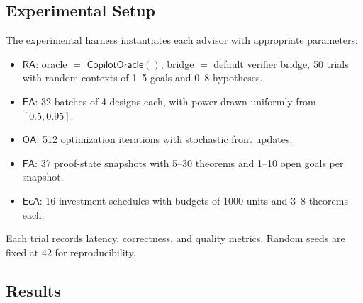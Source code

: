 \documentclass[11pt]{article}
\newcommand{\RA}{\mathsf{RA}}
\newcommand{\EA}{\mathsf{EA}}
\newcommand{\OA}{\mathsf{OA}}
\newcommand{\FA}{\mathsf{FA}}
\newcommand{\EcA}{\mathsf{EcA}}
\begin{document}
\subsection{Experimental Setup}\label{sec:exp-setup}

The experimental harness instantiates each advisor with
appropriate parameters:
\begin{itemize}
  \item $\RA$: oracle $=$ $\mathsf{CopilotOracle}()$, bridge
        $=$ default verifier bridge, 50 trials with random
        contexts of 1--5 goals and 0--8 hypotheses.
  \item $\EA$: 32 batches of 4 designs each, with power drawn
        uniformly from $[0.5, 0.95]$.
  \item $\OA$: 512 optimization iterations with stochastic front
        updates.
  \item $\FA$: 37 proof-state snapshots with 5--30 theorems and
        1--10 open goals per snapshot.
  \item $\EcA$: 16 investment schedules with budgets of 1000
        units and 3--8 theorems each.
\end{itemize}

Each trial records latency, correctness, and quality metrics.
Random seeds are fixed at 42 for reproducibility.

\subsection{Results}\label{sec:exp-results}
\end{document}
